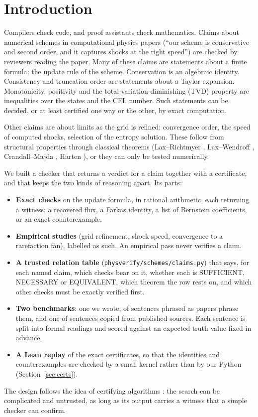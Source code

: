 \documentclass[11pt,a4paper]{article}
\newcommand{\code}[1]{\texttt{#1}}
\newcommand{\SUF}{\textsf{SUFFICIENT}}
\newcommand{\NEC}{\textsf{NECESSARY}}
\newcommand{\EQV}{\textsf{EQUIVALENT}}
\begin{document}
\section{Introduction}\label{sec:intro}

Compilers check code, and proof assistants check mathematics. Claims about numerical schemes in
computational physics papers (``our scheme is conservative and second order, and it captures shocks
at the right speed'') are checked by reviewers reading the paper. Many of these claims are statements
about a finite formula: the update rule of the scheme. Conservation is an algebraic identity.
Consistency and truncation order are statements about a Taylor expansion. Monotonicity, positivity and
the total-variation-diminishing (TVD) property are inequalities over the states and the CFL number.
Such statements can be decided, or at least certified one way or the other, by exact computation.

Other claims are about limits as the grid is refined: convergence order, the speed of computed shocks,
selection of the entropy solution. These follow from structural properties through classical theorems
(Lax--Richtmyer \cite{laxrichtmyer1956}, Lax--Wendroff \cite{laxwendroff1960}, Crandall--Majda
\cite{crandallmajda1980}, Harten \cite{harten1983}), or they can only be tested numerically.

We built a checker that returns a verdict for a claim together with a certificate, and that keeps
the two kinds of reasoning apart. Its parts:
\begin{itemize}
\item \textbf{Exact checks} on the update formula, in rational arithmetic, each returning a witness:
  a recovered flux, a Farkas identity, a list of Bernstein coefficients, or an exact counterexample.
\item \textbf{Empirical studies} (grid refinement, shock speed, convergence to a rarefaction fan),
  labelled as such. An empirical pass never verifies a claim.
\item \textbf{A trusted relation table} (\code{physverify/schemes/claims.py}) that says, for each named
  claim, which checks bear on it, whether each is \SUF, \NEC{} or \EQV, which theorem the row rests
  on, and which other checks must be exactly verified first.
\item \textbf{Two benchmarks}: one we wrote, of sentences phrased as papers phrase them, and one of
  sentences copied from published sources. Each sentence is split into formal readings and scored
  against an expected truth value fixed in advance.
\item \textbf{A Lean replay} of the exact certificates, so that the identities and counterexamples are
  checked by a small kernel rather than by our Python (Section~\ref{sec:certs}).
\end{itemize}
The design follows the idea of certifying algorithms \cite{mcconnell2011}: the search can be
complicated and untrusted, as long as its output carries a witness that a simple checker can confirm.
\end{document}

